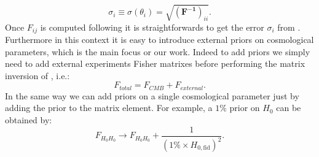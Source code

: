 \documentclass[aps,prd,preprint,groupedaddress]{revtex4-1}
\begin{document}
\begin{equation}
\sigma_i \equiv \sigma (\theta_i) = \sqrt{(\mathbf{ F^{-1}})_{ii}}.
\label{eqn:cramer-rao}
\end{equation}
Once $F_{ij}$ is computed following  it is straightforwards to get the error $\sigma_i$ from . Furthermore in this context it is easy to introduce external priors on cosmological parameters, which is the main focus or our work.
Indeed to add priors we simply need to add external experiments Fisher matrixes before performing the matrix inversion of , i.e.:
\begin{equation}
F_{total}=F_{CMB}+F_{external}.
\end{equation}
In the same way we can add priors on a single cosmological parameter just by adding the prior to the matrix element.
For example, a $1\%$ prior on $H_{0}$ can be obtained by:
\begin{equation}
F_{H_0 H_0} \rightarrow F_{H_0 H_0} + \frac{1}{(1\% \times H_{0,\text{fid}})^2}.
\end{equation}
\end{document}
